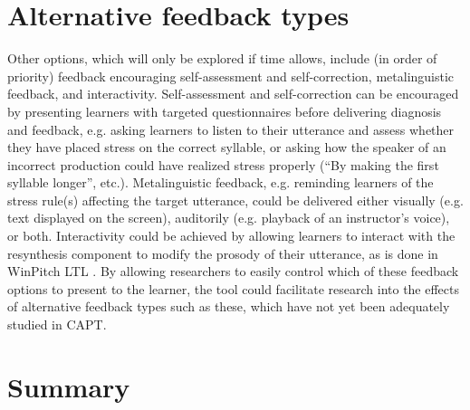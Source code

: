 
%	
	
	
	
\section{Alternative feedback types}
\label{sec:fb:alternative}

Other options, which will only be explored if time allows, include (in order of priority) feedback encouraging self-assessment and self-correction, metalinguistic feedback, and interactivity. %
 	Self-assessment and self-correction can be encouraged by presenting learners with targeted questionnaires before delivering diagnosis and feedback, e.g. asking learners to listen to their utterance and assess whether they have placed stress on the correct syllable, or 
 	asking how the speaker of an incorrect production could have realized stress properly (``By making the first syllable longer'', etc.). 
	Metalinguistic feedback, e.g. reminding learners %
of the stress rule(s) affecting the target utterance, could be delivered either visually (e.g. text displayed on the screen), auditorily (e.g. playback of an instructor's voice), or both. 
 	Interactivity could be achieved by allowing learners to interact with the resynthesis component to modify the prosody of their utterance, as is done in WinPitch LTL \citep{Martin2004}. %
 	By allowing researchers to easily control which of these feedback options to present to the learner, the tool could facilitate research into the effects of alternative feedback types such as these, which have not yet been adequately studied in CAPT.
 

%	
%	


\section{Summary}
\label{sec:fb:summary}